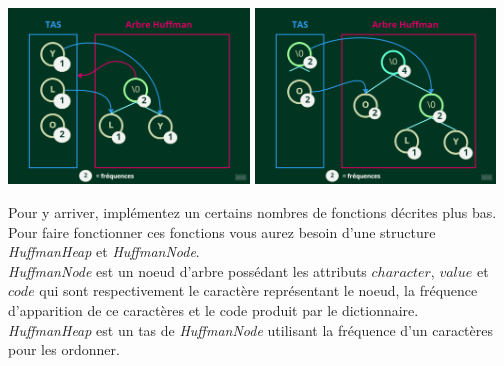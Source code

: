 \documentclass[11pt]{extarticle}
\begin{document}
\begin{center}
\includegraphics[width=0.48\textwidth]{images/huffman_heap.png}
\includegraphics[width=0.48\textwidth]{images/huffman_heap2.png}
\end{center}
\newpage
Pour y arriver, implémentez un certains nombres de fonctions décrites plus bas.\\
Pour faire fonctionner ces fonctions vous aurez besoin d'une structure \textit{HuffmanHeap} et \textit{HuffmanNode}.\\
\textit{HuffmanNode} est un noeud d'arbre possédant les attributs $character$, $value$ et $code$ qui sont respectivement le caractère représentant le noeud, la fréquence d'apparition de ce caractères et le code produit par le dictionnaire. \\
\textit{HuffmanHeap} est un tas de \textit{HuffmanNode} utilisant la fréquence d'un caractères pour les ordonner.
\end{document}

